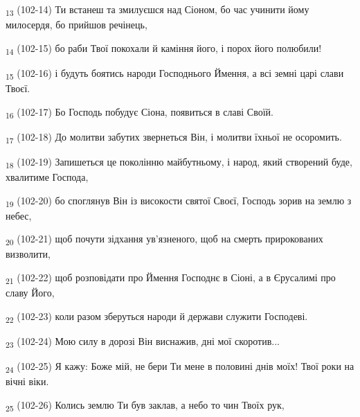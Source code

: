 \begin{tcolorbox}
\textsubscript{13} (102-14) Ти встанеш та змилуєшся над Сіоном, бо час учинити йому милосердя, бо прийшов речінець,
\end{tcolorbox}
\begin{tcolorbox}
\textsubscript{14} (102-15) бо раби Твої покохали й каміння його, і порох його полюбили!
\end{tcolorbox}
\begin{tcolorbox}
\textsubscript{15} (102-16) і будуть боятись народи Господнього Ймення, а всі земні царі слави Твоєї.
\end{tcolorbox}
\begin{tcolorbox}
\textsubscript{16} (102-17) Бо Господь побудує Сіона, появиться в славі Своїй.
\end{tcolorbox}
\begin{tcolorbox}
\textsubscript{17} (102-18) До молитви забутих звернеться Він, і молитви їхньої не осоромить.
\end{tcolorbox}
\begin{tcolorbox}
\textsubscript{18} (102-19) Запишеться це поколінню майбутньому, і народ, який створений буде, хвалитиме Господа,
\end{tcolorbox}
\begin{tcolorbox}
\textsubscript{19} (102-20) бо споглянув Він із високости святої Своєї, Господь зорив на землю з небес,
\end{tcolorbox}
\begin{tcolorbox}
\textsubscript{20} (102-21) щоб почути зідхання ув'язненого, щоб на смерть прирокованих визволити,
\end{tcolorbox}
\begin{tcolorbox}
\textsubscript{21} (102-22) щоб розповідати про Ймення Господнє в Сіоні, а в Єрусалимі про славу Його,
\end{tcolorbox}
\begin{tcolorbox}
\textsubscript{22} (102-23) коли разом зберуться народи й держави служити Господеві.
\end{tcolorbox}
\begin{tcolorbox}
\textsubscript{23} (102-24) Мою силу в дорозі Він виснажив, дні мої скоротив...
\end{tcolorbox}
\begin{tcolorbox}
\textsubscript{24} (102-25) Я кажу: Боже мій, не бери Ти мене в половині днів моїх! Твої роки на вічні віки.
\end{tcolorbox}
\begin{tcolorbox}
\textsubscript{25} (102-26) Колись землю Ти був заклав, а небо то чин Твоїх рук,
\end{tcolorbox}
